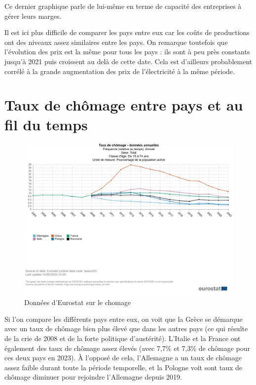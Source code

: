 \documentclass{article}
\begin{document}
Ce dernier graphique parle de lui-même en terme de capacité des entreprises à gérer leurs marges.

Il est ici plus difficile de comparer les pays entre eux car les coûts de productions ont des niveaux assez similaires entre les pays. On remarque toutefois que l'évolution des prix est la même pour tous les pays : ils sont à peu près constants jusqu'à 2021 puis croissent au delà de cette date. Cela est d'ailleurs probablement corrélé à la grande augmentation des prix de l'électricité à la même période.



\clearpage

\section{Taux de chômage entre pays et au fil du temps}
\begin{figure}[H]
  \centering
  \begin{minipage}{0.8\textwidth}
      \centering
      \includegraphics[width=\textwidth]{"chomage.png"}
      \caption{Données d'Eurostat sur le chomage}
  \end{minipage}
\end{figure}

Si l'on compare les différents pays entre eux, on voit que la Grèce se démarque avec un taux de chômage bien plus élevé que dans les autres pays (ce qui résulte de la crie de 2008 et de la forte politique d'austérité). L'Italie et la France ont également des taux de chômage assez élevés (avec 7,7\% et 7,3\% de chômage pour ces deux pays en 2023). À l'opposé de cela, l'Allemagne a un taux de chômage assez faible durant toute la période temporelle, et la Pologne voit sont taux de chômage diminuer pour rejoindre l'Allemagne depuis 2019.
\end{document}
